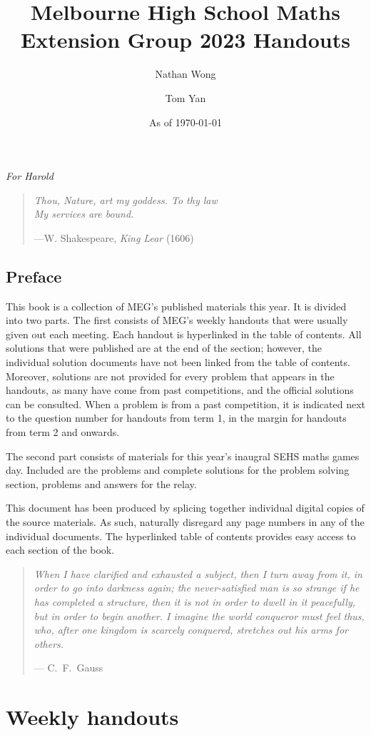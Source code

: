 \documentclass[a4paper]{amsbook}
\title{\textbf{Melbourne High School Maths Extension Group 2023 Handouts}}
\author{Nathan Wong\and Tom Yan}
\date{As of \today}
\newcommand{\epigraph}[2]{%
\newpage \vspace*{8cm}
\thispagestyle{empty}
  \begin{quote}
	  {	
    \emph{#1}
    \begin{flushright}---{#2}
    \end{flushright}}
  \end{quote}}
\begin{document}
\maketitle
\newpage \vspace*{8cm}
\thispagestyle{empty}
\begin{center}
	  \emph{For Harold}
\end{center}
\epigraph{Thou, Nature, art my goddess. To thy law\\
My services are bound.}{W. Shakespeare, \emph{King Lear} (1606)}
\chapter*{Preface}
This book is a collection of MEG's published
materials this year. 
It is divided into two parts.
The first consists of MEG's weekly handouts
that were usually given out each meeting.
Each handout is hyperlinked in the table of contents.
All solutions that were published are
at the end of the section; however, the individual
solution documents have not been linked from the table
of contents. Moreover, solutions are not provided
for every problem that appears in the handouts,
as many have come from past competitions, and the official
solutions can be consulted.
When a problem is from a past competition, it is indicated
next to the question number for handouts from term 1, in the margin
for handouts from term 2 and onwards.

The second part consists of materials for this year's inaugral
SEHS maths games day. Included
are the problems and complete solutions for the problem
solving section, problems and answers for the relay.

This document has been produced by splicing together
individual digital copies of the source materials.
As such, naturally disregard any page numbers in any
of the individual documents. The hyperlinked table of contents
provides easy access to each section of the book.
\tableofcontents
\epigraph{ When I have clarified and exhausted a subject,
then I turn away from it, in order to go into darkness again;
the never-satisfied man is so strange if he has completed a structure,
then it is not in order to dwell in it peacefully, but in order to begin another.
I imagine the world conqueror must feel thus, who,
after one kingdom is scarcely conquered, stretches out his arms for others.}{%
	C.~F.~Gauss}
\part{Weekly handouts}
\end{document}
